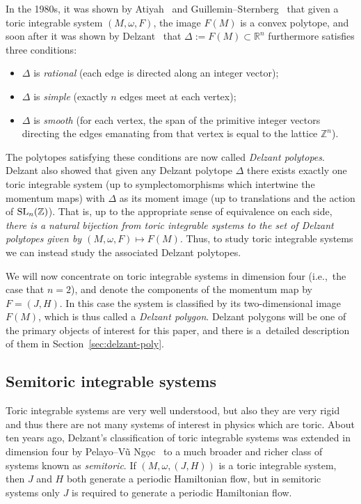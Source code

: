 \documentclass[pdftex]{sigma}
\numberwithin{equation}{section}
\def\R{{\mathbb R}}
\def\Z{{\mathbb Z}}
\newcommand{\De}{\Delta}
\newcommand{\om}{\omega}
\newcommand{\SLn}{{\rm SL}_n(\Z)}
\begin{document}
In the 1980s, it was shown by Atiyah~\cite{Atiyah} and Guillemin--Sternberg~\cite{GuSt1982} that given a toric integrable system $(M,\om,F)$, the image $F(M)$ is a convex polytope, and soon after it was shown by Delzant~\cite{De1988} that $\Delta:= F(M)\subset \R^n$ furthermore satisfies three conditions:
\begin{itemize}\itemsep=0pt
 \item $\De$ is \emph{rational} (each edge is directed along an integer vector);
 \item $\De$ is \emph{simple} (exactly $n$ edges meet at each vertex);
 \item $\De$ is \emph{smooth} (for each vertex, the span of the primitive integer vectors directing the edges emanating from that vertex is equal to the lattice $\Z^n$).
\end{itemize}
The polytopes satisfying these conditions are now called \emph{Delzant polytopes}.
Delzant also showed that given any Delzant polytope $\Delta$ there exists exactly one toric integrable system (up to symplectomorphisms which intertwine the momentum maps) with $\Delta$ as its moment image (up to translations and the action of $\SLn$).
That is, up to the appropriate sense of equivalence on each side, \emph{there is a natural bijection from toric integrable systems to the set of Delzant polytopes given by $(M,\om,F)\mapsto F(M)$}. Thus, to study toric integrable systems we can instead study the associated Delzant polytopes.


We will now concentrate on toric integrable systems in dimension four (i.e.,~the case that $n=2$), and denote the components of the momentum map by $F=(J,H)$. In this case the system is classified by its two-dimensional image $F(M)$, which is thus called a \emph{Delzant polygon}. Delzant polygons will be one of the primary objects of interest for this paper, and there is a~detailed description of them in Section~\ref{sec:delzant-poly}.



\subsection{Semitoric integrable systems}


Toric integrable systems are very well understood, but also they are very rigid and thus there are not many systems of interest in physics which are toric.
About ten years ago, Delzant's classification of toric integrable systems was extended in dimension four by Pelayo--V\~{u} Ng\d{o}c~\mbox{\cite{PeVN2009, PeVN2011}} to a much broader and richer class of systems known as \emph{semitoric}.
If $(M,\om,(J,H))$ is a toric integrable system, then $J$ and $H$ both generate a periodic Hamiltonian flow, but in semitoric systems only $J$ is required to generate a periodic Hamiltonian flow.
\end{document}
